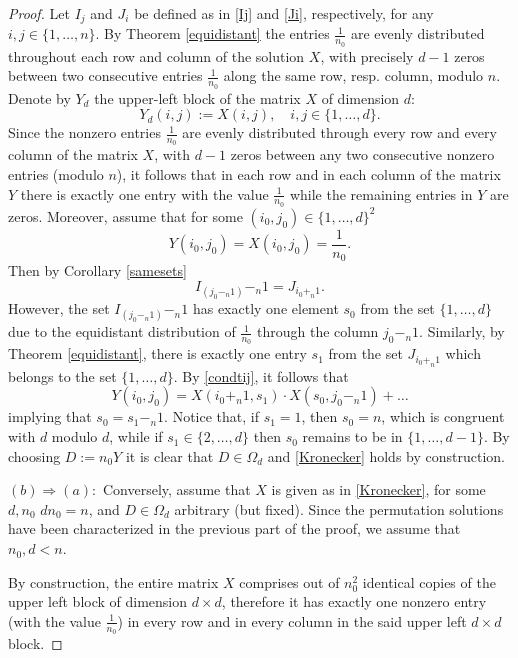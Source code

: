 \documentclass{article}
\theoremstyle{definition}\newtheorem{example}{Example}[section]
\begin{document}
\begin{proof}
		Let $I_j$ and $J_i$ be defined as in \eqref{Ij} and \eqref{Ji}, respectively, for any $i,j\in\{1,\ldots,n\}$. By Theorem \ref{equidistant} the entries $\frac{1}{n_0}$ are evenly distributed throughout each row and column of the solution $X$, with precisely $d-1$ zeros between two consecutive entries $\frac{1}{n_0}$ along the same row, resp. column, modulo $n$. Denote by $Y_d$  the upper-left block of the matrix $X$ of dimension $d$:
		$$Y_d(i,j):=X(i,j),\quad i,j\in\{1,\ldots,d\}.$$
		Since the nonzero entries $\frac{1}{n_0}$ are evenly distributed through every row and every column of the matrix $X$, with $d-1$ zeros between any two consecutive nonzero entries (modulo $n$), it follows that in each row and in each column of the matrix $Y$ there is exactly one entry with the value $\frac{1}{n_0}$ while the remaining entries in $Y$ are zeros. Moreover, assume that for some $(i_0,j_0)\in\{1,\ldots,d\}^2$ 
		$$Y(i_0,j_0)=X(i_0,j_0)=\frac{1}{n_0}.$$
		Then by Corollary \ref{samesets} 
		$$I_{(j_0-_n1)}-_n1=J_{i_0+_n1}.$$
		However, the set $I_{(j_0-_n1)}-_n1$ has exactly one element $s_0$ from the set $\{1,\ldots, d\}$ due to the equidistant distribution of $\frac{1}{n_0}$ through the column $j_0-_n1$. Similarly, by Theorem \ref{equidistant}, there is exactly one entry $s_1$ from the set $J_{i_0+_n1}$ which belongs to the set $\{1,\ldots,d\}$. By \eqref{condtij}, it follows that 
		$$Y(i_0,j_0)=X(i_0+_n1,s_1)\cdot X(s_0,j_0-_n1)+\ldots$$
		implying that $s_0=s_1-_n1$. Notice that, if $s_1=1$, then $s_0=n$, which is congruent with $d$ modulo $d$, while if $s_1\in\{2,\ldots, d\}$ then $s_0$ remains to be in $\{1,\ldots,d-1\}$. By choosing $D:=n_0 Y$ it is clear that $D\in\Omega_d$ and \eqref{Kronecker} holds by construction. 
		
		
		$(b)\Rightarrow (a):$ Conversely, assume that $X$ is given as in \eqref{Kronecker}, for some $d,n_0$ $dn_0=n$, and $D\in\Omega_d$ arbitrary (but fixed). Since the permutation solutions have been characterized in the previous part of the proof, we assume that $n_0,d<n$. 
		
		By construction, the entire matrix $X$ comprises out of $n_0^2$ identical copies of the upper left block of dimension $d\times d$, therefore it has exactly one nonzero entry (with the value $\frac{1}{n_0}$) in every row and in every column in the said upper left $d\times d$ block. 
		

\end{proof}
\end{document}
